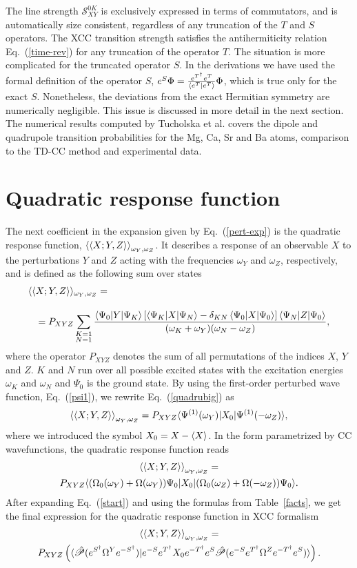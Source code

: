 \documentclass[preprint,12pt]{elsarticle}
\newcommand{\SSS}{\mathcal{S}}
\newcommand{\bb}[2]{\braket{ #1|#2}}
\newcommand{\equl}[2]{\begin{equation}\label{#2} #1 \end{equation}}
\newcommand{\equml}[2]{\begin{multline}\label{#2} #1 \end{multline}}
\newcommand{\equal}[2]{\begin{align}\label{#2} #1 \end{align}}
\newcommand{\fr}[1]{Eq.~(\ref{#1})}
\newcommand{\Frt}[1]{Table~\ref{#1}}
\newcommand{\quadraom}{\braket{\braket{X;Y,Z}}_{\omega_Y, \omega_Z}}
\newcommand{\quadru}[3]{\frac{\braket{\Psi_0|#1|\Psi_K} [\braket{\Psi_K|#2|\Psi_N} -\delta_{KN}\braket{\Psi_0|#2|\Psi_0}]\braket{\Psi_N|#3|\Psi_0}}{(\omega_K +\omega_{#1})(\omega_N -\omega_{#3})}}
\newcommand{\etd}{e^{T^\dagger}}
\newcommand{\esd}{e^{S^\dagger}}
\newcommand{\esdm}{e^{-S^\dagger}}
\newcommand{\etdm}{e^{-T^\dagger}}
\newcommand{\esm}{e^{-S}}
\newcommand{\es}{e^{S}}
\newcommand{\et}{e^{T}}
\newcommand{\omz}{\Omega^Z}
\newcommand{\omy}{\Omega^Y}
\newcommand{\xmz}{X_0}
\newcommand{\odpq}{\braket{\braket{X;Y,Z}}_{\omega_Y,\omega_Z}}
\newcommand{\phm}{\hat{\mathscr{P}}}
\newcommand{\pz}{\Psi_0}
\begin{document}
The line strength  $\SSS_{XY}^{0K}$
is exclusively expressed in terms of commutators, 
and is automatically size consistent, regardless
of any truncation of the $T$ and $S$ operators.
The XCC transition strength satisfies the antihermiticity relation \fr{time-rev}
for any truncation of the operator $T$. The situation is more complicated for the truncated operator $S$.
In the derivations  we have used the formal definition of the operator
$S$,  $e^S\Phi = \frac{\etd\et}{\braket{\et|\et}}\Phi$, which is true only for the exact $S$.
Nonetheless,  the deviations from the exact Hermitian
symmetry are numerically negligible.\cite{tucholska2014transition, tucholska2017transition} This issue is discussed in more detail in the next section. 
The numerical results computed by Tucholska et al.\cite{tucholska2014transition} covers the dipole and
quadrupole transition probabilities for the Mg, Ca, Sr and Ba atoms, comparison to the TD-CC method and experimental data.
 \section{Quadratic response function}
 The next coefficient in the  expansion given by \fr{pert-exp} is the 
quadratic response function, $\braket{\braket{X;Y,Z}}_{\omega_Y, \omega_Z}$. It describes
a response of an observable $X$
to the perturbations $Y$ and $Z$ acting with the frequencies $\omega_Y$ and $\omega_Z$, respectively, and is defined as 
 the following sum over states \cite{christiansen1998response}
\equal{\langle\langle X; Y, Z \rangle \rangle&_{\omega_Y, \omega_Z}=\\[10pt]
=P_{XYZ}&\sum_{\substack{K=1\\N=1}}\quadru{Y}{X}{Z}\nonumber,
}{quadrubig}
where the operator $P_{XYZ}$ denotes the sum of all  permutations of the indices $X$, $Y$ and $Z$. 
$K$ and $N$ run over all possible excited states with the excitation energies $\omega_K$ and $\omega_N$ and $\Psi_0$ is the ground state.
By using the first-order perturbed wave function, \fr{psi1}, we rewrite \fr{quadrubig} as
\equl{ \odpq = P_{XYZ}\langle \Psi^{(1)}(\omega_Y)|\xmz|\Psi^{(1)}(-\omega_Z) \rangle,}{podst}
where we introduced the symbol $X_0 = X-\braket{X}$. In the form parametrized by CC wavefunctions, the quadratic
response function  reads
\equml{\quadraom   = \\P_{XYZ} \langle (\Omega_0(\omega_Y) + \Omega(\omega_Y))\pz|\xmz|(\Omega_0(\omega_Z) + \Omega(-\omega_Z))\pz\rangle.
}{start}
After expanding  \fr{start} and  using the 
formulas from \Frt{facts}, we get
 the final expression for the quadratic response function in XCC formalism
\equml{\odpq = \\P_{XYZ}\left(\bb{\phm(\esd \omy\esdm) }{ \esm\etd X_0 \etdm\es \phm(\esm\etd\omz \etdm\es)}\right).}{quadru1}
\end{document}
